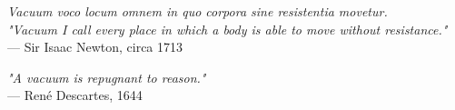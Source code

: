 \begin{flushright}
\emph{\textlatin{Vacuum voco locum omnem in quo corpora sine resistentia movetur.}}\\
\emph{"Vacuum I call every place in which a body is able to move without resistance."}\\
— Sir Isaac Newton, circa 1713
\end{flushright}

\vspace{2em}

\begin{flushright}
\emph{"A vacuum is repugnant to reason."}\\
— René Descartes, 1644
\end{flushright}
